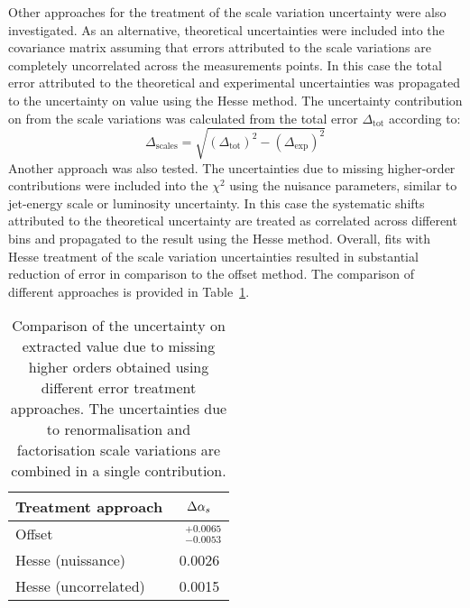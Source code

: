 Other approaches for the treatment of the scale variation uncertainty were also investigated. As an alternative, theoretical uncertainties were included into the covariance matrix assuming that errors attributed to the scale variations are completely uncorrelated across the measurements points. In this case the total error attributed to the theoretical and experimental uncertainties was propagated to the uncertainty on \asz value using the Hesse method. The uncertainty contribution on \as from the scale variations was calculated from the total error $\Delta_\text{tot}$ according to:
\begin{equation}
 \Delta_\text{scales} = \sqrt{\left(\Delta_\text{tot}\right)^2 - \left(\Delta_\text{exp}\right)^2}
 \label{eq:asuncscalecontrib}
\end{equation}
Another approach was also tested. The uncertainties due to missing higher-order contributions were included into the $\chi^2$ using the nuisance parameters, similar to jet-energy scale or luminosity uncertainty. In this case the systematic shifts attributed to the theoretical uncertainty are treated as correlated across different bins and propagated to the result using the Hesse method. Overall, fits with Hesse treatment of the scale variation uncertainties resulted in substantial reduction of \asz error in comparison to the offset method. The comparison of different approaches is provided in Table~\ref{tab:scaleuncvariants}.
\begin{table}[h]
\centering
\begin{tabular}{|l|c|}
 \hline
 Treatment approach & $\Delta\mbox{$\alpha_{s}$}$ \\
 \hline
 \hline
  Offset & $\phantom{x}^{+0.0065}_{-0.0053}$\\
  Hesse (nuissance) & 0.0026 \\
  Hesse (uncorrelated) & 0.0015 \\
 \hline
\end{tabular}
\caption{Comparison of the uncertainty on extracted \asz value due to missing higher orders obtained using different error treatment approaches. The uncertainties due to renormalisation and factorisation scale variations are combined in a single contribution.}
\label{tab:scaleuncvariants}
\end{table}

